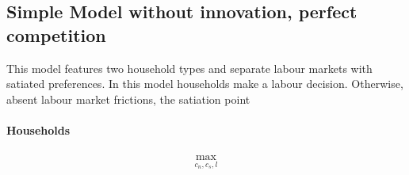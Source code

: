 \subsection{Simple Model without innovation, perfect competition}

This model features two household types and separate labour markets with satiated preferences. 
In this model households make a labour decision. Otherwise, absent labour market frictions, the satiation point 
\paragraph{Households}
\begin{align}
\max_{c_n, c_s, l}
\end{align}